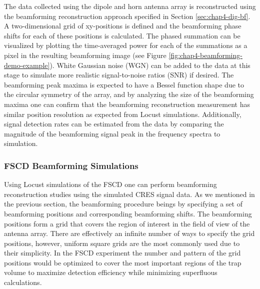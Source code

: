The data collected using the dipole and horn antenna array is reconstructed using the beamforming reconstruction approach specified in Section \ref{sec:chap4-dig-bf}. A two-dimensional grid of xy-positions is defined and the beamforming phase shifts for each of these positions is calculated. The phased summation can be visualized by plotting the time-averaged power for each of the summations as a pixel in the resulting beamforming image (see Figure \ref{fig:chap4-beamforming-demo-example}). White Gaussian noise (WGN) can be added to the data at this stage to simulate more realistic signal-to-noise ratios (SNR) if desired. The beamforming peak maxima is expected to have a Bessel function shape due to the circular symmetry of the array, and by analyzing the size of the beamforming maxima one can confirm that the beamforming reconstruction measurement has similar position resolution as expected from Locust simulations. Additionally, signal detection rates can be estimated from the data by comparing the magnitude of the beamforming signal peak in the frequency spectra to simulation.


\subsubsection*{FSCD Beamforming Simulations}

Using Locust simulations of the FSCD one can perform beamforming reconstruction studies using the simulated CRES signal data. As we mentioned in the previous section, the beamforming procedure beings by specifying a set of beamforming positions and corresponding beamforming shifts. The beamforming positions form a grid that covers the region of interest in the field of view of the antenna array. There are effectively an infinite number of ways to specify the grid positions, however, uniform square grids are the most commonly used due to their simplicity. In the FSCD experiment the number and pattern of the grid positions would be optimized to cover the most important regions of the trap volume to maximize detection efficiency while minimizing superfluous calculations.

